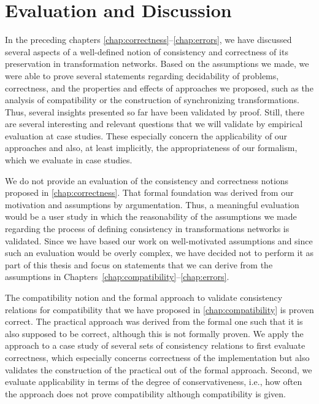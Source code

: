 \chapter{Evaluation and Discussion 
}
\label{chap:correctness_evaluation}

In the preceding chapters \ref{chap:correctness}--\ref{chap:errors}, we have discussed several aspects of a well-defined notion of consistency and correctness of its preservation in transformation networks.
Based on the assumptions we made, we were able to prove several statements regarding decidability of problems, correctness, and the properties and effects of approaches we proposed, such as the analysis of compatibility or the construction of synchronizing transformations.
Thus, several insights presented so far have been validated by proof.
Still, there are several interesting and relevant questions that we will validate by empirical evaluation at case studies.
These especially concern the applicability of our approaches and also, at least implicitly, the appropriateness of our formalism, which we evaluate in case studies.

We do not provide an evaluation of the consistency and correctness notions proposed in \autoref{chap:correctness}.
That formal foundation was derived from our motivation and assumptions by argumentation.
Thus, a meaningful evaluation would be a user study in which the reasonability of the assumptions we made regarding the process of defining consistency in transformations networks is validated.
Since we have based our work on well-motivated assumptions and since such an evaluation would be overly complex, we have decided not to perform it as part of this thesis and focus on statements that we can derive from the assumptions in Chapters~\ref{chap:compatibility}--\ref{chap:errors}.

The compatibility notion and the formal approach to validate consistency relations for compatibility that we have proposed in \autoref{chap:compatibility} is proven correct.
The practical approach was derived from the formal one such that it is also supposed to be correct, although this is not formally proven.
We apply the approach to a case study of several sets of consistency relations to first evaluate correctness, which especially concerns correctness of the implementation but also validates the construction of the practical out of the formal approach.
Second, we evaluate applicability in terms of the degree of conservativeness, i.e., how often the approach does not prove compatibility although compatibility is given.

